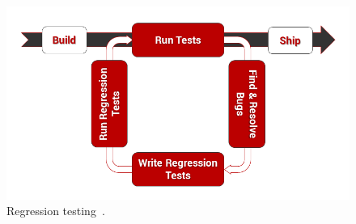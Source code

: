 \documentclass[a4paper,12pt]{book}
\begin{document}
{\begin{figure}[H]
  \centering
    \includegraphics[width=1.0\textwidth]{regression}
    \caption{Regression testing~\cite{reg}.}
    \label{fig:automation}
\end{figure}

}
\end{document}
